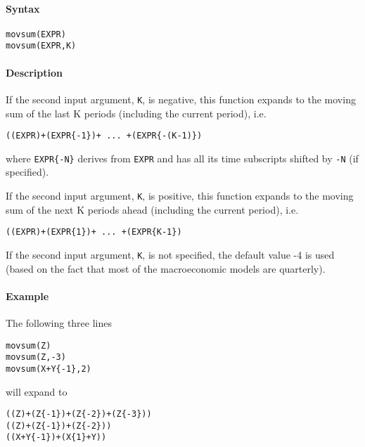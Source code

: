 


	\paragraph{Syntax}

\begin{verbatim}
movsum(EXPR)
movsum(EXPR,K)
\end{verbatim}

\paragraph{Description}

If the second input argument, \texttt{K}, is negative, this function
expands to the moving sum of the last K periods (including the current
period), i.e.

\begin{verbatim}
((EXPR)+(EXPR{-1})+ ... +(EXPR{-(K-1)})
\end{verbatim}

where \texttt{EXPR\{-N\}} derives from \texttt{EXPR} and has all its
time subscripts shifted by \texttt{-N} (if specified).

If the second input argument, \texttt{K}, is positive, this function
expands to the moving sum of the next K periods ahead (including the
current period), i.e.

\begin{verbatim}
((EXPR)+(EXPR{1})+ ... +(EXPR{K-1})
\end{verbatim}

If the second input argument, \texttt{K}, is not specified, the default
value -4 is used (based on the fact that most of the macroeconomic
models are quarterly).

\paragraph{Example}

The following three lines

\begin{verbatim}
movsum(Z)
movsum(Z,-3)
movsum(X+Y{-1},2)
\end{verbatim}

will expand to

\begin{verbatim}
((Z)+(Z{-1})+(Z{-2})+(Z{-3}))
((Z)+(Z{-1})+(Z{-2}))
((X+Y{-1})+(X{1}+Y))
\end{verbatim}


